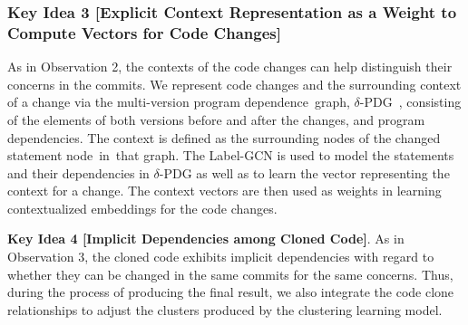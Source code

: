
\subsubsection{\bf Key Idea 3 [Explicit Context Representation as a Weight to
    Compute Vectors for Code Changes]}

As in Observation 2, the contexts of the code changes can help
distinguish their concerns in the commits. We represent code changes
and the surrounding context of a change via the multi-version program
dependence~graph, $\delta$-PDG~\cite{flexeme-fse20}, consisting of the
elements of both versions before and after the changes, and program
dependencies. The context is defined as the surrounding nodes of the
changed statement node~in~that graph. The Label-GCN is used to model
the statements and their dependencies in $\delta$-PDG as well as to
learn the vector representing the context for a change. The context
vectors are then used as weights in learning contextualized embeddings
for the code changes.

\vspace{3pt}
{\bf Key Idea 4 [Implicit Dependencies among Cloned Code]}. As in
Observation 3, the cloned code exhibits implicit dependencies with
regard to whether they can be changed in the same commits for the same
concerns. Thus, during the process of producing the final
result, we also integrate the code clone relationships to
adjust the clusters produced by the clustering learning model.

